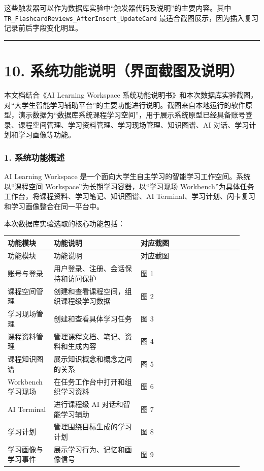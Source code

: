\documentclass[10pt,a4paper,fontset=none]{ctexart}
\begin{document}
这些触发器可以作为数据库实验中“触发器代码及说明”的主要内容。其中 \texttt{TR\_FlashcardReviews\_AfterInsert\_UpdateCard} 最适合截图展示，因为插入复习记录前后字段变化明显。\par

\bigskip\hrule\bigskip

\clearpage
\section*{10. 系统功能说明（界面截图及说明）}

本文档结合《AI Learning Workspace 系统功能说明书》和本次数据库实验截图，对“大学生智能学习辅助平台”的主要功能进行说明。截图来自本地运行的软件原型，演示数据为“数据库系统课程学习空间”，用于展示系统原型已经具备账号登录、课程空间管理、学习资料管理、学习现场管理、知识图谱、AI 对话、学习计划和学习画像等功能。\par

\subsubsection*{1. 系统功能概述}

AI Learning Workspace 是一个面向大学生自主学习的智能学习工作空间。系统以“课程空间 Workspace”为长期学习容器，以“学习现场 Workbench”为具体任务工作台，将课程资料、学习笔记、知识图谱、AI Terminal、学习计划、闪卡复习和学习画像整合在同一平台中。\par

本次数据库实验选取的核心功能包括：\par

\begingroup\scriptsize
\renewcommand{\arraystretch}{1.18}
\setlength{\LTleft}{0pt}
\setlength{\LTright}{0pt}
\begin{longtable}{>{\raggedright\arraybackslash}p{0.18\linewidth}>{\raggedright\arraybackslash}p{0.34\linewidth}>{\raggedright\arraybackslash}p{0.40\linewidth}}
\toprule
功能模块 & 功能说明 & 对应截图 \\
\midrule
\endfirsthead
\toprule
功能模块 & 功能说明 & 对应截图 \\
\midrule
\endhead
账号与登录 & 用户登录、注册、会话保持和访问保护 & 图 1 \\
课程空间管理 & 创建和查看课程空间，组织课程级学习数据 & 图 2 \\
学习现场管理 & 创建和查看具体学习任务 & 图 3 \\
课程资料管理 & 管理课程文档、笔记、资料和生成内容 & 图 4 \\
课程知识图谱 & 展示知识概念和概念之间的关系 & 图 5 \\
Workbench 学习现场 & 在任务工作台中打开和组织学习资料 & 图 6 \\
AI Terminal & 进行课程级 AI 对话和智能学习辅助 & 图 7 \\
学习计划 & 管理围绕目标生成的学习计划 & 图 8 \\
学习画像与学习事件 & 展示学习行为、记忆和画像信号 & 图 9 \\
\bottomrule
\end{longtable}
\endgroup
\end{document}
